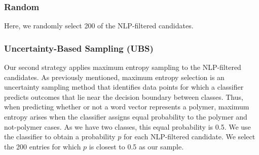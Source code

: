 \subsubsection{Random}
Here, we randomly select 200 of the NLP-filtered candidates.

\subsubsection{Uncertainty-Based Sampling (UBS)}
Our second strategy applies maximum entropy sampling to the NLP-filtered candidates. %
As previously mentioned, maximum entropy selection is an uncertainty sampling method that
identifies data points for which a classifier predicts outcomes that lie near the decision boundary 
between classes. 
Thus, when predicting whether or not a word vector represents a polymer, 
maximum entropy arises when the classifier assigns equal probability to the polymer and not-polymer cases.
As we have two classes, this equal probability is 0.5.
We use the classifier to obtain a probability $p$ for each NLP-filtered candidate. 
We select the 200 entries for which $p$ is closest to 0.5 as our sample.

